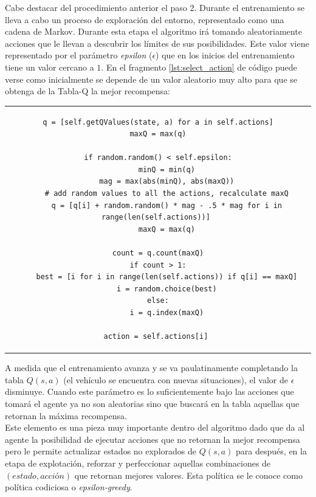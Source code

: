 Cabe destacar del procedimiento anterior el paso 2. Durante el entrenamiento se lleva a cabo un proceso de exploración del entorno, representado como una cadena de Markov. Durante esta etapa el algoritmo irá tomando aleatoriamente acciones que le llevan a descubrir los límites de sus posibilidades. Este valor viene representado por el parámetro \textit{epsilon} ($\epsilon$) que en los inicios del entrenamiento tiene un valor cercano a $1$. En el fragmento \ref{lst:select_action} de código puede verse como inicialmente se depende de un valor aleatorio muy alto para que se obtenga de la Tabla-Q la mejor recompensa:\\

\vspace{5mm}

\begin{tabular}{c}
\begin{lstlisting}[basicstyle=\ttfamily\scriptsize, caption={Selección de acciones: exporación vs explotación.}, captionpos=b, numbers=none, label={lst:select_action}, style=Python] 
q = [self.getQValues(state, a) for a in self.actions]
maxQ = max(q)

if random.random() < self.epsilon:
    minQ = min(q)
    mag = max(abs(minQ), abs(maxQ))
    # add random values to all the actions, recalculate maxQ
    q = [q[i] + random.random() * mag - .5 * mag for i in range(len(self.actions))] 
    maxQ = max(q)

count = q.count(maxQ)
if count > 1:
    best = [i for i in range(len(self.actions)) if q[i] == maxQ]
    i = random.choice(best)
else:
    i = q.index(maxQ)

action = self.actions[i] 
\end{lstlisting}
\end{tabular}

\vspace{5mm}

A medida que el entrenamiento avanza y se va paulatinamente completando la tabla $Q(s,a)$ (el vehículo se encuentra con nuevas situaciones), el valor de $\epsilon$ disminuye. Cuando este parámetro es lo suficientemente bajo las acciones que tomará el agente ya no son aleatorias sino que buscará en la tabla aquellas que retornan la máxima recompensa.\\

Este elemento es una pieza muy importante dentro del algoritmo dado que da al agente la posibilidad de ejecutar acciones que no retornan la mejor recompensa pero le permite actualizar estados no explorados de $Q(s,a)$ para después, en la etapa de explotación, reforzar y perfeccionar aquellas combinaciones de $(estado, acción)$ que retornan mejores valores. Esta política se le conoce como política codiciosa o \textit{epsilon-greedy}.\\

